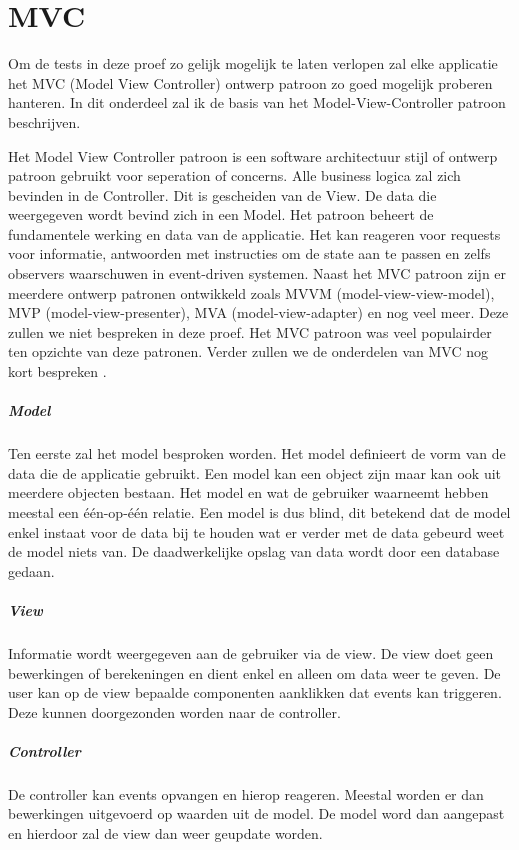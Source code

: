 \section{MVC}
\label{sec:MVC}

Om de tests in deze proef zo gelijk mogelijk te laten verlopen zal elke applicatie het MVC (Model View Controller) ontwerp patroon zo goed mogelijk proberen hanteren. In dit onderdeel zal ik de basis van het Model-View-Controller patroon beschrijven.

Het Model View Controller patroon is een software architectuur stijl of ontwerp patroon gebruikt voor seperation of concerns. Alle business logica zal zich bevinden in de Controller. Dit is gescheiden van de View. De data die weergegeven wordt bevind zich in een Model. Het patroon beheert de fundamentele werking en data van de applicatie. Het kan reageren voor requests voor informatie, antwoorden met instructies om de state aan te passen en zelfs observers waarschuwen in event-driven systemen. Naast het MVC patroon zijn er meerdere ontwerp patronen ontwikkeld zoals MVVM (model-view-view-model), MVP (model-view-presenter), MVA (model-view-adapter) en nog veel meer. Deze zullen we niet bespreken in deze proef. Het MVC patroon was veel populairder ten opzichte van deze patronen. Verder zullen we de onderdelen van MVC nog kort bespreken \autocite{atwood_understanding_2008} \autocite{_model-view-controller_2014}.

\subparagraph{Model}
\label{sec:MVC_Model}
Ten eerste zal het model besproken worden. Het model definieert de vorm van de data die de applicatie gebruikt. Een model kan een object zijn maar kan ook uit meerdere objecten bestaan. Het model en wat de gebruiker waarneemt hebben meestal een één-op-één relatie. Een model is dus blind, dit betekend dat de model enkel instaat voor de data bij te houden wat er verder met de data gebeurd weet de model niets van. De daadwerkelijke opslag van data wordt door een database gedaan.

\subparagraph{View}
\label{sec:MVC_View}
Informatie wordt weergegeven aan de gebruiker via de view. De view doet geen bewerkingen of berekeningen en dient enkel en alleen om data weer te geven. De user kan op de view bepaalde componenten aanklikken dat events kan triggeren. Deze kunnen doorgezonden worden naar de controller.

\subparagraph{Controller}
\label{sec:MVC_Controller}
De controller kan events opvangen en hierop reageren. Meestal worden er dan bewerkingen uitgevoerd op waarden uit de model. De model word dan aangepast en hierdoor zal de view dan weer geupdate worden.

